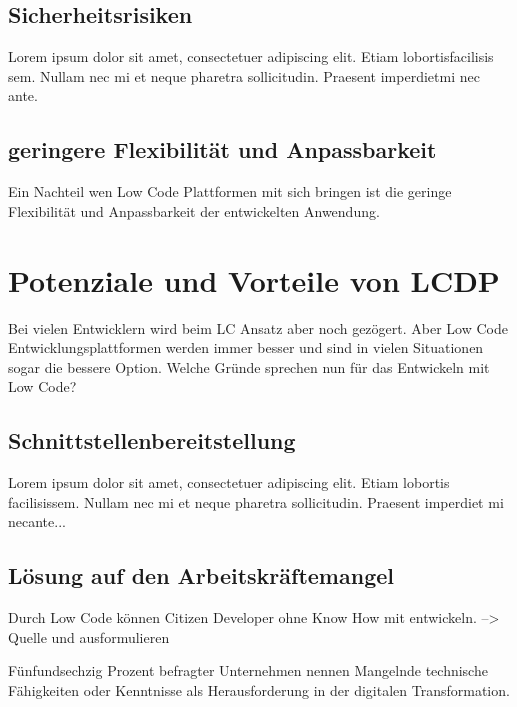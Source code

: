 \documentclass{article}
\begin{document}
	\subsection{Sicherheitsrisiken}	
	Lorem  ipsum  dolor  sit  amet,  consectetuer  adipiscing  
	elit.   Etiam  lobortisfacilisis sem.  Nullam nec mi et 
	neque pharetra sollicitudin.  Praesent imperdietmi nec ante.  
	
	\subsection{geringere Flexibilität und Anpassbarkeit}	
	Ein Nachteil wen Low Code Plattformen mit sich bringen ist die geringe Flexibilität und Anpassbarkeit der entwickelten Anwendung. %
	
	\section{Potenziale und Vorteile von LCDP}
	
	Bei vielen Entwicklern wird beim LC Ansatz aber noch gezögert. 
	Aber Low Code Entwicklungsplattformen werden immer besser und sind in vielen Situationen sogar die bessere Option. Welche Gründe sprechen nun für das Entwickeln %
	mit Low Code?
	
	\subsection{Schnittstellenbereitstellung} 
	Lorem ipsum dolor sit amet, consectetuer adipiscing elit.  
	Etiam lobortis facilisissem.  Nullam nec mi et neque pharetra 
	sollicitudin.  Praesent imperdiet mi necante...
	
	\subsection{Lösung auf den Arbeitskräftemangel}
	Durch Low Code können Citizen Developer ohne Know How mit entwickeln. --> Quelle und ausformulieren
	
	Fünfundsechzig Prozent befragter Unternehmen nennen Mangelnde technische Fähigkeiten oder Kenntnisse als Herausforderung in der digitalen Transformation. \cite{EmmaVanPelt.2019} %
	
\end{document}

